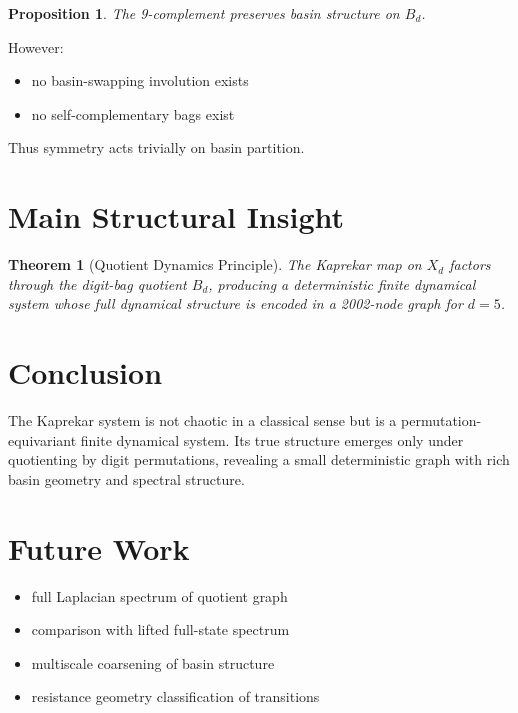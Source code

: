 \documentclass[11pt]{article}
\newtheorem{theorem}{Theorem}
\newtheorem{proposition}{Proposition}
\begin{document}
\begin{proposition}
The 9-complement preserves basin structure on $B_d$.
\end{proposition}

However:
\begin{itemize}
\item no basin-swapping involution exists
\item no self-complementary bags exist
\end{itemize}

Thus symmetry acts trivially on basin partition.

\section{Main Structural Insight}

\begin{theorem}[Quotient Dynamics Principle]
The Kaprekar map on $X_d$ factors through the digit-bag quotient $B_d$, producing a deterministic finite dynamical system whose full dynamical structure is encoded in a 2002-node graph for $d=5$.
\end{theorem}

\section{Conclusion}

The Kaprekar system is not chaotic in a classical sense but is a permutation-equivariant finite dynamical system. Its true structure emerges only under quotienting by digit permutations, revealing a small deterministic graph with rich basin geometry and spectral structure.

\section{Future Work}

\begin{itemize}
\item full Laplacian spectrum of quotient graph
\item comparison with lifted full-state spectrum
\item multiscale coarsening of basin structure
\item resistance geometry classification of transitions
\end{itemize}
\end{document}
